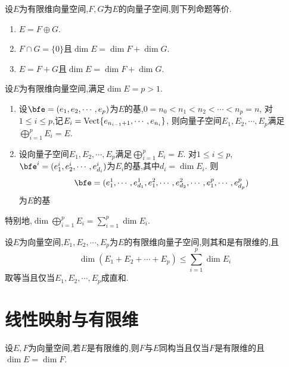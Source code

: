 \begin{prop}
    设$E$为有限维向量空间,$F, G$为$E$的向量子空间,则下列命题等价.

    \begin{enumerate}
        \item $E = F \oplus G$.
        \item $F \cap G = \{0\}$且$\dim E = \dim F + \dim G$.
        \item $E = F + G$且$\dim E = \dim F + \dim G$.
    \end{enumerate}
\end{prop}

\begin{prop}
    设$E$为有限维向量空间,满足$\dim E = p > 1$.

    \begin{enumerate}
        \item 设$\bfe = (e_1, e_2, \cdots, e_p)$为$E$的基,$0 = n_0 < n_1 < n_2 < \cdots < n_p = n$,
            对$1 \leqslant i \leqslant p$,记$E_i = \operatorname{Vect} \{ e_{n_{i - 1} + 1}, \cdots, e_{n_i} \}$,
            则向量子空间$E_1, E_2, \cdots, E_p$满足$\bigoplus\limits_{i = 1}^p E_i = E$.
        \item 设向量子空间$E_1, E_2, \cdots, E_p$满足$\bigoplus\limits_{i = 1}^p E_i = E$.
            对$1 \leqslant i \leqslant p$,$\bfe^i = (e_1^i, e_2^i, \cdots, e_{d_i}^i)$为$E_i$的基,其中$d_i = \dim E_i$.
            则\[ \bfe = (e_1^1, \cdots, e_{d_1}^1, e_1^2, \cdots, e_{d_2}^2, \cdots, e_1^p, \cdots, e_{d_p}^p) \]
            为$E$的基
    \end{enumerate}
\end{prop}

\begin{rqq}
    特别地,$\dim \bigoplus\limits_{i = 1}^p E_i = \sum\limits_{i = 1}^p \dim E_i$.
\end{rqq}

\begin{prop}
    设$E$为向量空间,$E_1, E_2, \cdots, E_p$为$E$的有限维向量子空间,则其和是有限维的,且
    \[ \dim (E_1 + E_2 + \cdots + E_p) \leqslant \sum\limits_{i = 1}^p \dim E_i \]
    取等当且仅当$E_1, E_2, \cdots, E_p$成直和.
\end{prop}

\section{线性映射与有限维}

\begin{prop}
    设$E, F$为向量空间,若$E$是有限维的,则$F$与$E$同构当且仅当$F$是有限维的且$\dim E = \dim F$.
\end{prop}

